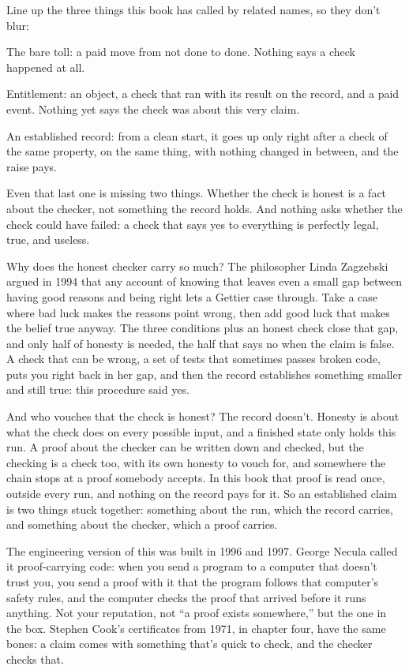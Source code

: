 \documentclass[11pt,twoside]{article}
\theoremstyle{thielethm}
\theoremstyle{thieledef}
\theoremstyle{thieledef}
\theoremstyle{thieledef}
\theoremstyle{thielethm}
\theoremstyle{thieleobs}
\theoremstyle{thielethm}
\begin{document}
Line up the three things this book has called by related names, so they don't blur:

The bare toll: a paid move from not done to done. Nothing says a check happened at all.

Entitlement: an object, a check that ran with its result on the record, and a paid event. Nothing yet says the check was about this very claim.

An established record: from a clean start, it goes up only right after a check of the same property, on the same thing, with nothing changed in between, and the raise pays.

Even that last one is missing two things. Whether the check is honest is a fact about the checker, not something the record holds. And nothing asks whether the check could have failed: a check that says yes to everything is perfectly legal, true, and useless.

Why does the honest checker carry so much? The philosopher Linda Zagzebski argued in 1994 that any account of knowing that leaves even a small gap between having good reasons and being right lets a Gettier case through. Take a case where bad luck makes the reasons point wrong, then add good luck that makes the belief true anyway. The three conditions plus an honest check close that gap, and only half of honesty is needed, the half that says no when the claim is false. A check that can be wrong, a set of tests that sometimes passes broken code, puts you right back in her gap, and then the record establishes something smaller and still true: this procedure said yes.

And who vouches that the check is honest? The record doesn't. Honesty is about what the check does on every possible input, and a finished state only holds this run. A proof about the checker can be written down and checked, but the checking is a check too, with its own honesty to vouch for, and somewhere the chain stops at a proof somebody accepts. In this book that proof is read once, outside every run, and nothing on the record pays for it. So an established claim is two things stuck together: something about the run, which the record carries, and something about the checker, which a proof carries.

The engineering version of this was built in 1996 and 1997. George Necula called it proof-carrying code: when you send a program to a computer that doesn't trust you, you send a proof with it that the program follows that computer's safety rules, and the computer checks the proof that arrived before it runs anything. Not your reputation, not ``a proof exists somewhere,'' but the one in the box. Stephen Cook's certificates from 1971, in chapter four, have the same bones: a claim comes with something that's quick to check, and the checker checks that.
\end{document}
